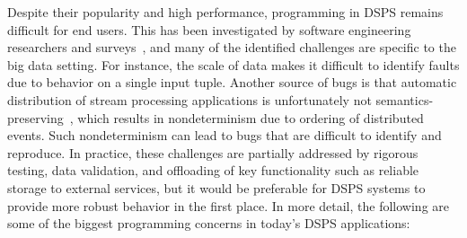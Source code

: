 Despite their popularity and high performance,
programming in DSPS remains difficult for end users.
This has been investigated by software engineering researchers
and surveys~\cite{gulzar2016bigdebug,fisher2012interactions,vianna2019exploratory},
and many of the identified challenges are specific to the big data setting.
For instance, the scale of data makes it difficult to identify faults due to behavior on a single input tuple.
Another source of bugs is that
automatic distribution of stream processing applications
is unfortunately not semantics-preserving~\cite{xiao2014nondeterminism,schneider2013safe,hirzel2014catalog},
which results in nondeterminism due to ordering of distributed events.
Such nondeterminism can lead to bugs that are difficult to identify and reproduce.
In practice, these challenges are partially addressed by rigorous testing, data validation, and offloading of key functionality such as reliable storage to external services, but it would be preferable for DSPS systems to provide more robust behavior in the first place.
In more detail, the following are some of the biggest programming concerns in today's DSPS applications:

